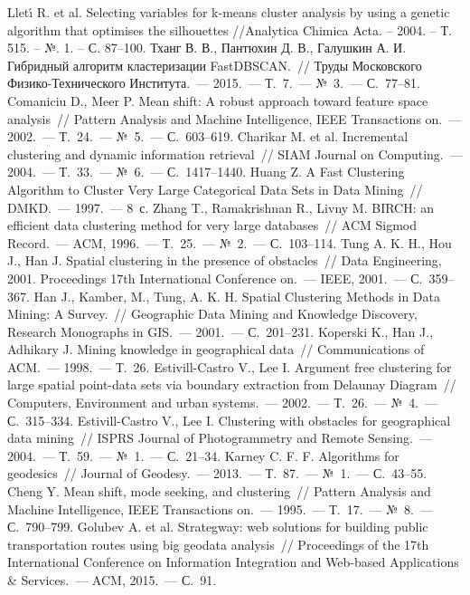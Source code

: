 \begin{thebibliography}{99}
     Llet\'{\i} R. et al. Selecting variables for k-means cluster analysis by using a genetic algorithm that optimises the silhouettes //Analytica Chimica Acta. – 2004. – Т. 515. – №. 1. – С. 87--100.
     Тханг В. В., Пантюхин Д. В., Галушкин А. И. Гибридный алгоритм кластеризации FastDBSCAN.~// Труды Московского Физико-Технического Института.~--- 2015.~--- Т.~7.~--- №~3.~--- С.~77--81.
     Comaniciu D., Meer P. Mean shift: A robust approach toward feature space analysis~// Pattern Analysis and Machine Intelligence, IEEE Transactions on.~--- 2002.~--- Т.~24.~--- №~5.~--- С.~603--619.
     Charikar M. et al. Incremental clustering and dynamic information retrieval~// SIAM Journal on Computing.~--- 2004.~--- Т.~33.~--- №~6.~--- С.~1417--1440.
     Huang Z. A Fast Clustering Algorithm to Cluster Very Large Categorical Data Sets in Data Mining~// DMKD.~--- 1997.~--- 8~с.
     Zhang T., Ramakrishnan R., Livny M. BIRCH: an efficient data clustering method for very large databases~// ACM Sigmod Record.~--- ACM, 1996.~--- Т.~25.~--- №~2.~--- С.~103--114.
     Tung A. K. H., Hou J., Han J. Spatial clustering in the presence of obstacles~// Data Engineering, 2001. Proceedings 17th International Conference on.~--- IEEE, 2001.~--- С.~359--367.
     Han J., Kamber, M., Tung, A. K. H. Spatial Clustering Methods in Data Mining: A Survey.~// Geographic Data Mining and Knowledge Discovery, Research Monographs in GIS.~--- 2001.~--- С.~201--231.
     Koperski K., Han J., Adhikary J. Mining knowledge in geographical data~// Communications of ACM.~--- 1998.~--- Т.~26.
     Estivill-Castro V., Lee I. Argument free clustering for large spatial point-data sets via boundary extraction from Delaunay Diagram~// Computers, Environment and urban systems.~--- 2002.~--- Т.~26.~--- №~4.~--- С.~315--334.
     Estivill-Castro V., Lee I. Clustering with obstacles for geographical data mining~// ISPRS Journal of Photogrammetry and Remote Sensing.~--- 2004.~--- Т.~59.~--- №~1.~--- С.~21--34.
     Karney C. F. F. Algorithms for geodesics~// Journal of Geodesy.~--- 2013.~--- Т.~87.~--- №~1.~--- С.~43--55.
     Cheng Y. Mean shift, mode seeking, and clustering~// Pattern Analysis and Machine Intelligence, IEEE Transactions on.~--- 1995.~--- Т.~17.~--- №~8.~--- С.~790--799.
     Golubev A. et al. Strategway: web solutions for building public transportation routes using big geodata analysis~// Proceedings of the 17th International Conference on Information Integration and Web-based Applications \& Services.~--- ACM, 2015.~--- С.~91.

\end{thebibliography}
